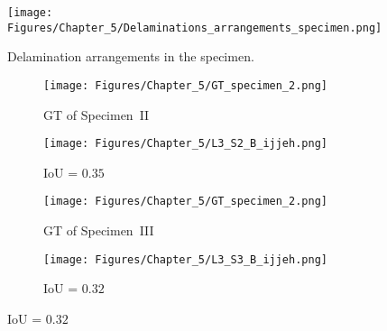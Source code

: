 \begin{figure} [h!]
	\centering
	\texttt{[image: Figures/Chapter\_5/Delaminations\_arrangements\_specimen.png]}
	\caption{Delamination arrangements in the specimen.}
	\label{fig:Delaminations_arrangements_specimen}
\end{figure}
\begin{figure} [!h]
	\centering
	\begin{subfigure}[b]{0.47\textwidth}
		\centering
		\texttt{[image: Figures/Chapter\_5/GT\_specimen\_2.png]}
		\caption{GT of Specimen~II}
		\label{fig:GT_specimen_2}
	\end{subfigure}
	\hfill
	\begin{subfigure}[b]{0.47\textwidth}
		\centering
		\texttt{[image: Figures/Chapter\_5/L3\_S2\_B\_ijjeh.png]}
		\caption{IoU = \(0.35\)} 
		\label{fig:L3_S2_B_ijjeh}
	\end{subfigure}
	\par\medskip
	\begin{subfigure}[b]{0.47\textwidth}
		\centering
		\texttt{[image: Figures/Chapter\_5/GT\_specimen\_2.png]}
		\caption{GT of Specimen~III}
		\label{fig:gt_specimen_3}
	\end{subfigure}
	\hfill
	\begin{subfigure}[b]{0.47\textwidth}
		\centering
		\texttt{[image: Figures/Chapter\_5/L3\_S3\_B\_ijjeh.png]}
		\caption{IoU = \(0.32\)} 
		\label{fig:L3_S3_B_ijjeh}
	\end{subfigure}
	\par\medskip

\end{figure}
